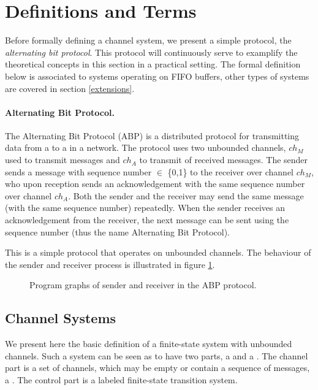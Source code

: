 \section{Definitions and Terms}
Before formally defining a channel system, we present a simple protocol, the \emph{alternating bit protocol}. This protocol will continuously serve to examplify the theoretical concepts in this section in a practical setting. The formal definition below is associated to systems operating on FIFO buffers, other types of systems are covered in section \ref{extensions}. 

\paragraph{Alternating Bit Protocol.} The Alternating Bit Protocol (ABP) is a distributed protocol for transmitting data from a  to a  in a network. The protocol uses two unbounded channels, $ch_M$ used to transmit messages and $ch_A$ to transmit  of received messages. The sender sends a message with sequence number  $\in$ \{0,1\} to the receiver over channel $ch_M$, who upon reception sends an acknowledgement with the same sequence number over channel $ch_A$. Both the sender and the receiver may send the same message (with the same sequence number) repeatedly. When the sender receives an acknowledgement from the receiver, the next message can be sent using the sequence number  (thus the name Alternating Bit Protocol).

This is a simple protocol that operates on unbounded channels. The behaviour of the sender and receiver process is illustrated in figure \ref{abpgraph}.

\begin{figure}[h!]
\subfloat[Sender]{\label{fig:in}
\abpsender{}
}
\subfloat[Receiver]{\label{fig:in}
\abpreceiver{}
}
\caption{Program graphs of sender and receiver in the ABP protocol.}
\label{abpgraph}
\end{figure}

\subsection{Channel Systems}
We present here the basic definition of a finite-state system with unbounded channels. Such a system can be seen as to have two parts, a  and a . The channel part is a set of channels, which may be empty or contain a sequence of messages, a . The control part is a labeled finite-state transition system. 

